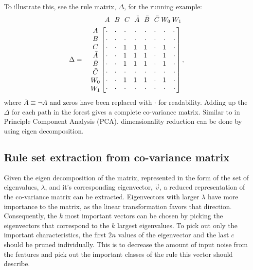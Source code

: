 \documentclass[10pt]{article}
\begin{document}
To illustrate this, see the rule matrix, $\Delta$, for the running example:
\begin{align*}
&\;\:A\:\:\:B\:\:\:C\:\:\:\bar{A}\:\:\:\bar{B}\:\:\:\bar{C}\:W_0\:W_1\\
\Delta = \quad \mqty{A\\B\\C\\\bar{A}\\\bar{B}\\\bar{C}\\W_0\\W_1}\, &\mqty[\cdot&\cdot&\cdot&\cdot&\cdot&\cdot&\cdot&\cdot\:\\\cdot&\cdot&\cdot&\cdot&\cdot&\cdot&\cdot&\cdot\\\cdot&\cdot&1&1&1&\cdot&1&\cdot\\\cdot&\cdot&1&1&1&\cdot&1&\cdot\\\cdot&\cdot&1&1&1&\cdot&1&\cdot\\\cdot&\cdot&\cdot&\cdot&\cdot&\cdot&\cdot&\cdot\\\cdot&\cdot&1&1&1&\cdot&1&\cdot\\\cdot&\cdot&\cdot&\cdot&\cdot&\cdot&\cdot&\cdot] \, ,
\end{align*}
where $\bar{A} \equiv \neg A$ and zeros have been replaced with $\cdot$ for readability. Adding up the $\Delta$ for each path in the forest gives a complete co-variance matrix. Similar to in Principle Component Analysis (PCA), dimensionality reduction can be done by using eigen decomposition.

\subsection{Rule set extraction from co-variance matrix}
Given the eigen decomposition of the matrix, represented in the form of the set of eigenvalues, $\lambda$, and it's corresponding eigenvector, $\vec{v}$, a reduced representation of the co-variance matrix can be extracted. Eigenvectors with larger $\lambda$ have more importance to the matrix, as the linear transformation favors that direction. Consequently, the $k$ most important vectors can be chosen by picking the eigenvectors that correspond to the $k$ largest eigenvalues. To pick out only the important characteristics, the first $2n$ values of the eigenvector and the last $c$ should be pruned individually. This is to decrease the amount of input noise from the features and pick out the important classes of the rule this vector should describe. 
\end{document}
